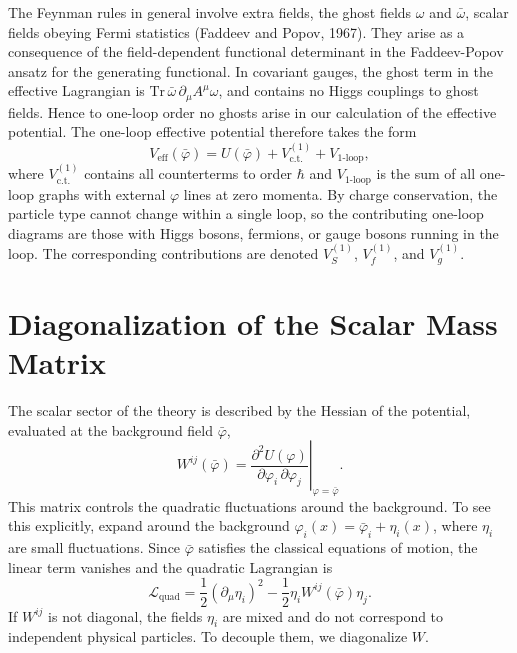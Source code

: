 The Feynman rules in general involve extra fields, the ghost fields
$\omega$ and $\bar\omega$, scalar fields obeying Fermi statistics
(Faddeev and Popov, 1967). They arise as a consequence of the
field-dependent functional determinant in the Faddeev-Popov ansatz for
the generating functional. In covariant gauges, the ghost term in the
effective Lagrangian is $\mathrm{Tr}\,\bar\omega\,\partial_\mu A^\mu\omega$,
and contains no Higgs couplings to ghost fields. Hence to one-loop order
no ghosts arise in our calculation of the effective potential. The
one-loop effective potential therefore takes the form
\begin{equation}
    V_{\text{eff}}(\bar\varphi) = U(\bar\varphi)
    + V_{\text{c.t.}}^{(1)}
    + V_{1\text{-loop}},
    \label{eq:Veff-decomposition}
\end{equation}
where $V_{\text{c.t.}}^{(1)}$ contains all counterterms to order $\hbar$
and $V_{1\text{-loop}}$ is the sum of all one-loop graphs with external
$\varphi$ lines at zero momenta. By charge conservation, the particle
type cannot change within a single loop, so the contributing one-loop
diagrams are those with Higgs bosons, fermions, or gauge bosons running
in the loop. The corresponding contributions are denoted $V_S^{(1)}$,
$V_f^{(1)}$, and $V_g^{(1)}$.

\section{Diagonalization of the Scalar Mass Matrix}

The scalar sector of the theory is described by the Hessian of the
potential, evaluated at the background field $\bar\varphi$,
\begin{equation}
    W^{ij}(\bar\varphi) = \left.\frac{\partial^2 U(\varphi)}
    {\partial\varphi_i\,\partial\varphi_j}\right|_{\varphi=\bar\varphi}.
    \label{eq:Wij-def}
\end{equation}
This matrix controls the quadratic fluctuations around the background.
To see this explicitly, expand around the background
$\varphi_i(x) = \bar\varphi_i + \eta_i(x)$, where $\eta_i$ are small
fluctuations. Since $\bar\varphi$ satisfies the classical equations of
motion, the linear term vanishes and the quadratic Lagrangian is
\begin{equation}
    \mathcal{L}_{\text{quad}} = \frac{1}{2}(\partial_\mu\eta_i)^2
    - \frac{1}{2}\eta_i W^{ij}(\bar\varphi)\eta_j.
\end{equation}
If $W^{ij}$ is not diagonal, the fields $\eta_i$ are mixed and do not
correspond to independent physical particles. To decouple them, we
diagonalize $W$.

